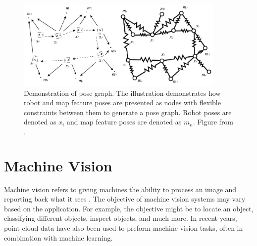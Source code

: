\begin{figure}[htp]
  \centering
  \includegraphics[width = 0.9\textwidth]{Figures/figposeGraph.pdf}
  \caption{Demonstration of pose graph. The illustration demonstrates how robot and map feature poses are presented as nodes with flexible constraints between them to generate a pose graph. Robot poses are denoted as $x_i$ and map feature poses are denoted as $m_n$. Figure from \cite{SiegwartRoland2011Itam}.}
  \label{fig:poseGraph}
\end{figure}



\section{Machine Vision} \label{sec:T:MachineVision}
Machine vision refers to giving machines the ability to process an image and reporting back what it sees \cite{SnyderWesleyE.2010Mv}. The objective of machine vision systems may vary based on the application. For example, the objective might be to locate an object, classifying different objects, inspect objects, and much more. In recent years, point cloud data have also been used to preform machine vision tasks, often in combination with machine learning.


